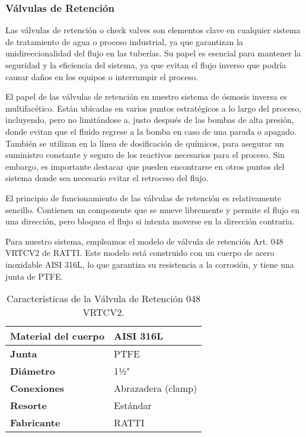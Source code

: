 \subsubsection{Válvulas de Retención} \label{sec:valvula_retencion}

Las válvulas de retención o check valves son elementos clave en cualquier sistema de tratamiento de agua o proceso industrial, ya que garantizan la unidireccionalidad del flujo en las tuberías. Su papel es esencial para mantener la seguridad y la eficiencia del sistema, ya que evitan el flujo inverso que podría causar daños en los equipos o interrumpir el proceso.

El papel de las válvulas de retención en nuestro sistema de ósmosis inversa es multifacético. Están ubicadas en varios puntos estratégicos a lo largo del proceso, incluyendo, pero no limitándose a, justo después de las bombas de alta presión, donde evitan que el fluido regrese a la bomba en caso de una parada o apagado. También se utilizan en la línea de dosificación de químicos, para asegurar un suministro constante y seguro de los reactivos necesarios para el proceso. Sin embargo, es importante destacar que pueden encontrarse en otros puntos del sistema donde sea necesario evitar el retroceso del flujo.

El principio de funcionamiento de las válvulas de retención es relativamente sencillo. Contienen un componente que se mueve libremente y permite el flujo en una dirección, pero bloquea el flujo si intenta moverse en la dirección contraria.

Para nuestro sistema, empleamos el modelo de válvula de retención Art. 048 VRTCV2 de RATTI. Este modelo está construido con un cuerpo de acero inoxidable AISI 316L, lo que garantiza su resistencia a la corrosión, y tiene una junta de PTFE.



\begin{table}[H]
    \centering
    \caption{Características de la Válvula de Retención 048 VRTCV2.}
    \label{table:valvula_retencion}
    \begin{tabular}{| L{6cm} | L{6cm} |}
        \hline
        \textbf{Material del cuerpo} & AISI 316L          \\
        \hline
        \textbf{Junta}               & PTFE               \\
        \hline
        \textbf{Diámetro}            & 1½"                \\
        \hline
        \textbf{Conexiones}          & Abrazadera (clamp) \\
        \hline
        \textbf{Resorte}             & Estándar           \\
        \hline
        \textbf{Fabricante}          & RATTI              \\
        \hline
    \end{tabular}
\end{table}


